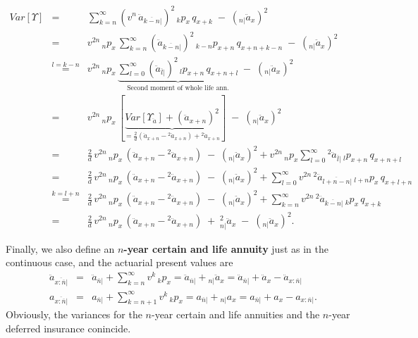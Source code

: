 \documentclass[11pt,fleqn,oneside]{book}
\begin{document}
\begin{eqnarray*}
Var[\Upsilon] &=& \sum_{k=n}^{\infty} \left(v^n\,\ddot{a}_{\overline{k-n}|}\right)^2 \,{_kp_x}\,{q_{x+k}} \;-\; \left({_{n|}\ddot{a}_x}\right)^2\\
&=& v^{2n}\,{_np_x}\,\sum_{k=n}^{\infty}  \left(\ddot{a}_{\overline{k-n}|}\right)^2\,{_{k-n}p_{x+n}}\,{q_{x+n+k-n}} \;-\; \left({_{n|}\ddot{a}_x}\right)^2\\
&\stackrel{l=k-n}{=}&  v^{2n}\,{_np_x}\,\underbrace{\sum_{l=0}^{\infty}  \left(\ddot{a}_{\overline{l}|}\right)^2\,{_{l}p_{x+n}}\,{q_{x+n+l}}}_{\text{Second moment of whole life ann.}}  \;-\; \left({_{n|}\ddot{a}_x}\right)^2 \\
&=&  v^{2n}\,{_np_x}\,\left[\underbrace{Var[\Upsilon_{\ddot{a}}] + \left(\ddot{a}_{x+n}\right)^2}_{ = \frac{2}{d}\left(\ddot{a}_{x+n} - {^2\ddot{a}_{x+n}}\right) + {^2\ddot{a}_{x+n}}}\right]  \;-\; \left({_{n|}\ddot{a}_x}\right)^2\\
&=& \frac{2}{d}\,v^{2n}\,{_np_x}\,\left(\ddot{a}_{x+n} - {^2\ddot{a}_{x+n}}\right) \;-\; \left({_{n|}\ddot{a}_x}\right)^2 + v^{2n}\,{_np_x} \sum_{l=0}^{\infty} {^2\ddot{a}_{\overline{l}|}} \,{_lp_{x+n}}\,q_{x+n+l}\\
&=& \frac{2}{d}\,v^{2n}\,{_np_x}\,\left(\ddot{a}_{x+n} - {^2\ddot{a}_{x+n}}\right) \;-\; \left({_{n|}\ddot{a}_x}\right)^2 + \sum_{l=0}^{\infty} v^{2n}\, {^2\ddot{a}_{\overline{l+n-n}|}} \,{_{l+n}p_{x}}\,q_{x+l+n}\\
&\stackrel{k=l+n}{=}&\frac{2}{d}\,v^{2n}\,{_np_x}\,\left(\ddot{a}_{x+n} - {^2\ddot{a}_{x+n}}\right) \;-\; \left({_{n|}\ddot{a}_x}\right)^2 + \sum_{k=n}^{\infty} v^{2n}\, {^2\ddot{a}_{\overline{k-n}|}} \,{_{k}p_{x}}\,q_{x+k}\\
&=& \frac{2}{d}\,v^{2n}\,{_np_x}\,\left(\ddot{a}_{x+n} - {^2\ddot{a}_{x+n}}\right)\;+\; {^2_{n|}\ddot{a}_x} \;-\; \left({_{n|}\ddot{a}_x}\right)^2.
\end{eqnarray*}

Finally, we also define an \textbf{$n$-year certain and life annuity} just as in the continuous case, and the actuarial present values are
\begin{eqnarray*}
\ddot{a}_{\overline{x:\overline{n}|}} &=& \ddot{a}_{\overline{n}|} + \sum_{k=n}^{\infty} v^k\,{_kp_x}= \ddot{a}_{\overline{n}|} +  {_{n|}\ddot{a}_x} = \ddot{a}_{\overline{n}|}  + \ddot{a}_x -  \ddot{a}_{x:\overline{n}|}\\
a_{\overline{x:\overline{n}|}} &=& a_{\overline{n}|} + \sum_{k=n+1}^{\infty} v^k\,{_kp_x}
= a_{\overline{n}|} +  {_{n|}a_x} = a_{\overline{n}|}  + a_x -  a_{x:\overline{n}|}.
\end{eqnarray*}
Obviously, the variances for the $n$-year certain and life annuities and the $n$-year deferred insurance conincide.
\end{document}
